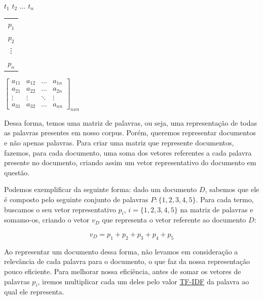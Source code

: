\documentclass[a4paper,12pt]{article}
\begin{document}
 \begin{center}
 \hspace{0.2cm}$t_{1}$ \hspace{0.5cm} $t_{2}$ \hspace{0.3cm} $\hdots$ \hspace{0.4cm}$t_{n}$
 
 \vspace{0.2cm}
 
\begin{tabular}{c}
   $p_{1}$ \\
   $p_{2}$ \\
   \vdots\\
   $p_{n}$
 \end{tabular}
 $
 \begin{bmatrix}
  a_{11} & a_{12} & \hdots & a_{1n}\\
  a_{21} & a_{22} & \hdots & a_{2n}\\
  \vdots & \vdots & \ddots & \vdots\\
  a_{31} & a_{32} & \hdots & a_{nn}
 \end{bmatrix}_{nxn}
$

\end{center}

Dessa forma, temos uma matriz de palavras, ou seja, uma representação de todas as palavras presentes em nosso corpus.
Porém, queremos representar documentos e não apenas palavras.
Para criar uma matriz que represente documentos, fazemos, para cada documento, uma soma dos vetores referentes a cada palavra presente
no documento, criando assim um vetor representativo do documento em questão.

Podemos exemplificar da seguinte forma: dado um documento $D$, sabemos que ele é composto pelo seguinte conjunto de palavras
$P:\{1,2,3,4,5\}$. Para cada termo, buscamos o seu vetor representativo $p_{i}$, $i =\{1,2,3,4,5\}$ na matriz de
palavras e somamo-os, criando o vetor $v_{D}$ que representa o vetor referente ao documento $D$:

\begin{equation}
  v_{D} = p_{1}+p_{2}+p_{3}+p_{4}+p_{5}
\end{equation}


Ao representar um documento dessa forma, não levamos em consideração a relevância de cada palavra para o documento, o que
faz da nossa representação pouco eficiente. Para melhorar nossa 
eficiência, antes de somar os vetores de palavras $p_{i}$, iremos multiplicar cada um deles pelo valor \hyperref[sec:nlp]{TF-IDF} da palavra
ao qual ele representa.
\end{document}
